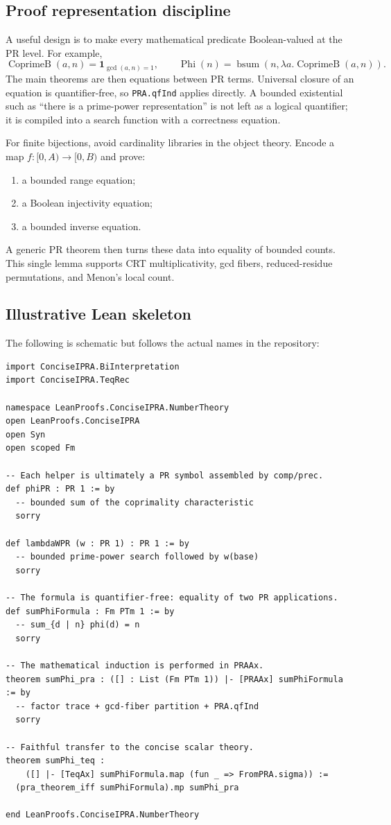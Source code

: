\documentclass[11pt]{article}
\theoremstyle{definition}
\newcommand{\code}[1]{\nolinkurl{#1}}
\newcommand{\ind}[1]{\mathbf 1_{#1}}
\begin{document}
\subsection{Proof representation discipline}

A useful design is to make every mathematical predicate Boolean-valued at the
PR level.  For example,
\[
 \operatorname{CoprimeB}(a,n)=\ind{\gcd(a,n)=1},
 \qquad
 \operatorname{Phi}(n)=\operatorname{bsum}(n,\lambda a.
 \operatorname{CoprimeB}(a,n)).
\]
The main theorems are then equations between PR terms.  Universal closure of
an equation is quantifier-free, so \code{PRA.qfInd} applies directly.  A
bounded existential such as ``there is a prime-power representation'' is not
left as a logical quantifier; it is compiled into a search function with a
correctness equation.

For finite bijections, avoid cardinality libraries in the object theory.
Encode a map \(f:[0,A)\to[0,B)\) and prove:
\begin{enumerate}
\item a bounded range equation;
\item a Boolean injectivity equation;
\item a bounded inverse equation.
\end{enumerate}
A generic PR theorem then turns these data into equality of bounded counts.
This single lemma supports CRT multiplicativity, gcd fibers, reduced-residue
permutations, and Menon's local count.

\subsection{Illustrative Lean skeleton}

The following is schematic but follows the actual names in the repository:

\begin{lstlisting}
import ConciseIPRA.BiInterpretation
import ConciseIPRA.TeqRec

namespace LeanProofs.ConciseIPRA.NumberTheory
open LeanProofs.ConciseIPRA
open Syn
open scoped Fm

-- Each helper is ultimately a PR symbol assembled by comp/prec.
def phiPR : PR 1 := by
  -- bounded sum of the coprimality characteristic
  sorry

def lambdaWPR (w : PR 1) : PR 1 := by
  -- bounded prime-power search followed by w(base)
  sorry

-- The formula is quantifier-free: equality of two PR applications.
def sumPhiFormula : Fm PTm 1 := by
  -- sum_{d | n} phi(d) = n
  sorry

-- The mathematical induction is performed in PRAAx.
theorem sumPhi_pra : ([] : List (Fm PTm 1)) |- [PRAAx] sumPhiFormula := by
  -- factor trace + gcd-fiber partition + PRA.qfInd
  sorry

-- Faithful transfer to the concise scalar theory.
theorem sumPhi_teq :
    ([] |- [TeqAx] sumPhiFormula.map (fun _ => FromPRA.sigma)) :=
  (pra_theorem_iff sumPhiFormula).mp sumPhi_pra

end LeanProofs.ConciseIPRA.NumberTheory
\end{lstlisting}
\end{document}
